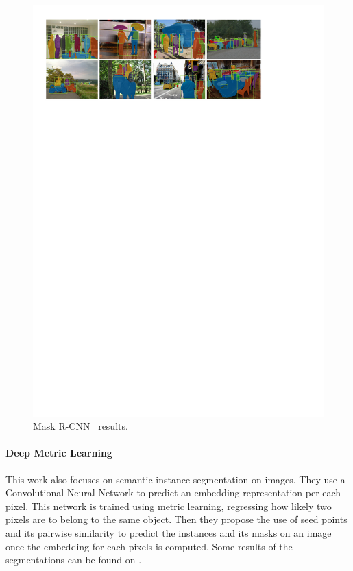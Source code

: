 \begin{figure}[h]
  \centering
  \includegraphics[width=1.\linewidth]{figures/maskrcnn/results.pdf}
  \caption{Mask R-CNN~\cite{he2017mask} results. }
  \label{fig:maskrcnn}
\end{figure}

\paragraph{Deep Metric Learning~\deepml}
This work also focuses on semantic instance segmentation on images.
They use a Convolutional Neural Network to predict an embedding representation per each pixel.
This network is trained using metric learning, regressing how likely two pixels are to belong to the same object.
Then they propose the use of seed points and its pairwise similarity to predict the instances and its masks on an image once the embedding for each pixels is computed.
Some results of the segmentations can be found on .

